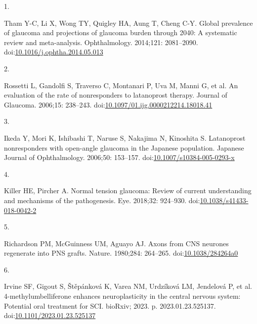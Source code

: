 \documentclass[
  12pt,
  a4paper,
]{book}
\newlength{\cslhangindent}
\newlength{\csllabelwidth}
\newlength{\cslentryspacingunit} %
\newenvironment{CSLReferences}[2] %
 {%
  \setlength{\parindent}{0pt}
  \ifodd #1
  \let\oldpar\par
  \def\par{\hangindent=\cslhangindent\oldpar}
  \fi
  \setlength{\parskip}{#2\cslentryspacingunit}
 }%
 {}
\newcommand{\CSLLeftMargin}[1]{\parbox[t]{\csllabelwidth}{#1}}
\newcommand{\CSLRightInline}[1]{\parbox[t]{\linewidth - \csllabelwidth}{#1}\break}
\begin{document}
\hypertarget{refs}{}
\begin{CSLReferences}{0}{0}
\leavevmode{}%
\CSLLeftMargin{1. }%
\CSLRightInline{Tham Y-C, Li X, Wong TY, Quigley HA, Aung T, Cheng C-Y. Global prevalence of glaucoma and projections of glaucoma burden through 2040: A systematic review and meta-analysis. Ophthalmology. 2014;121: 2081--2090. doi:\href{https://doi.org/10.1016/j.ophtha.2014.05.013}{10.1016/j.ophtha.2014.05.013}}

\leavevmode{}%
\CSLLeftMargin{2. }%
\CSLRightInline{Rossetti L, Gandolfi S, Traverso C, Montanari P, Uva M, Manni G, et al. An evaluation of the rate of nonresponders to latanoprost therapy. Journal of Glaucoma. 2006;15: 238--243. doi:\href{https://doi.org/10.1097/01.ijg.0000212214.18018.41}{10.1097/01.ijg.0000212214.18018.41}}

\leavevmode{}%
\CSLLeftMargin{3. }%
\CSLRightInline{Ikeda Y, Mori K, Ishibashi T, Naruse S, Nakajima N, Kinoshita S. Latanoprost nonresponders with open-angle glaucoma in the {Japanese} population. Japanese Journal of Ophthalmology. 2006;50: 153--157. doi:\href{https://doi.org/10.1007/s10384-005-0293-x}{10.1007/s10384-005-0293-x}}

\leavevmode{}%
\CSLLeftMargin{4. }%
\CSLRightInline{Killer HE, Pircher A. Normal tension glaucoma: Review of current understanding and mechanisms of the pathogenesis. Eye. 2018;32: 924--930. doi:\href{https://doi.org/10.1038/s41433-018-0042-2}{10.1038/s41433-018-0042-2}}

\leavevmode{}%
\CSLLeftMargin{5. }%
\CSLRightInline{Richardson PM, McGuinness UM, Aguayo AJ. Axons from {CNS} neurones regenerate into {PNS} grafts. Nature. 1980;284: 264--265. doi:\href{https://doi.org/10.1038/284264a0}{10.1038/284264a0}}

\leavevmode{}%
\CSLLeftMargin{6. }%
\CSLRightInline{Irvine SF, Gigout S, Štěpánková K, Varea NM, Urdzíková LM, Jendelová P, et al. 4-methylumbelliferone enhances neuroplasticity in the central nervous system: Potential oral treatment for {SCI}. {bioRxiv}; 2023. p. 2023.01.23.525137. doi:\href{https://doi.org/10.1101/2023.01.23.525137}{10.1101/2023.01.23.525137}}


\end{CSLReferences}
\end{document}
